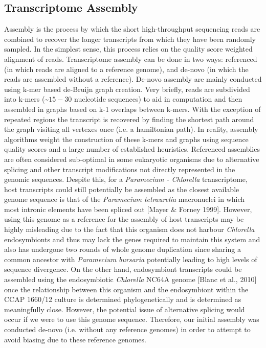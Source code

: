 \documentclass[a4paper,11pt]{article}
\begin{document}
\subsection{Transcriptome Assembly}
Assembly is the process by which the short high-throughput sequencing reads are combined to recover the longer transcripts from which they have been randomly sampled.  
In the simplest sense, this process relies on the quality score weighted alignment of reads.  
Transcriptome assembly can be done in two ways: referenced (in which reads are aligned to a reference genome), and de-novo (in which the reads are assembled without a reference).  
De-novo assembly are mainly conducted using k-mer based de-Bruijn graph creation.  
Very briefly, reads are subdivided into k-mers (\textasciitilde $15-30$ nucleotide sequences) to aid in computation and then assembled in graphs based on k-1 overlaps between k-mers.
With the exception of repeated regions the transcript is recovered by finding the shortest path around the graph visiting all vertexes once (i.e. a hamiltonian path). 
In reality, assembly algorithms weight the construction of these k-mers and graphs using sequence quality scores and a large number of established heuristics.
Referenced assemblies are often considered sub-optimal in some eukaryotic organisms due to alternative splicing and other transcript modifications not directly represented in the genomic sequences.  
Despite this, for a \textit{Paramecium - Chlorella} transcriptome, host transcripts could still potentially be assembled as the closest available genome sequence is that of the \textit{Paramecium tetraurelia} macronuclei in which most intronic elements have been spliced out [Mayer \& Forney 1999].  
However, using this genome as a reference for the assembly of host transcripts may be highly misleading due to the fact that this organism does not harbour \textit{Chlorella} endosymbionts and thus may lack the genes required to maintain this system and also has undergone two rounds of whole genome duplication since sharing a common ancestor with \textit{Paramecium bursaria} potentially leading to high levels of sequence divergence.  
On the other hand, endosymbiont transcripts could be assembled using the endosymbiotic \textit{Chlorella} NC64A genome [Blanc et al., 2010] once the relationship between this organism and the endosymbiont within the CCAP 1660/12 culture is determined phylogenetically and is determined as meaningfully close.  However, the potential issue of alternative splicing would occur if we were to use this genome sequence.  
Therefore, our initial assembly was conducted de-novo (i.e. without any reference genomes) in order to attempt to avoid biasing due to these reference genomes.   
\end{document}
